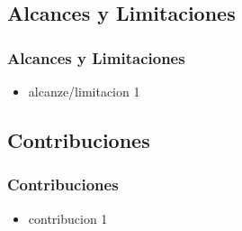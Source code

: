 \subsection{Alcances y Limitaciones}

\begin{frame}
    \frametitle{Alcances y Limitaciones}
    \begin{itemize}
        \item alcanze/limitacion 1
    \end{itemize}
\end{frame}




\subsection{Contribuciones}
\begin{frame}
    \frametitle{Contribuciones}
    \begin{itemize}
        \item contribucion 1
    \end{itemize}
\end{frame}



